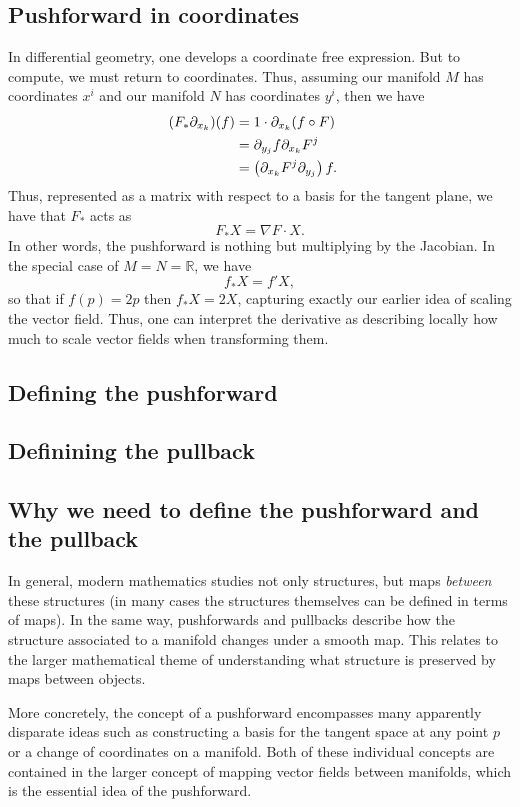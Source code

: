 \documentclass[12pt,letterpaper,boxed]{article}
\newcommand{\R}{{\mathbb{R}}}
\begin{document}
\subsection{Pushforward in coordinates}
In differential geometry, one develops a coordinate free expression. But to compute, we must return to coordinates. Thus, assuming our manifold $M$ has coordinates $x^i$ and our manifold $N$ has coordinates $y^i$, then we have
\[
	\begin{aligned}
		(F_*  \partial_{x_k} )(f) &= 1 \cdot \partial_{x_k} (f \circ F) \cr
		  	       		  &= \partial_{y_j} f \partial_{x_k} F^j \cr
					  &= \left( \partial_{x_k} F^j \partial_{y_j} \right) f.
	\end{aligned}
\]
Thus, represented as a matrix with respect to a basis for the tangent plane, we have that $F_*$ acts as
\[
	F_* X = \nabla F \cdot X.
\]
In other words, the pushforward is nothing but multiplying by the Jacobian. In the special case of $M = N = \R$, we have
\[
	f_* X = f' X,
\]
so that if $f(p) = 2p$ then $f_* X = 2 X$, capturing exactly our earlier idea of scaling the vector field. Thus, one can interpret the derivative as describing locally how much to scale vector fields when transforming them.
\subsection{Defining the pushforward}

\subsection{Definining the pullback}

\subsection{Why we need to define the pushforward and the pullback}
In general, modern mathematics studies not only structures, but maps \textit{between} these structures (in many cases the structures themselves can be defined in terms of maps). In the same way, pushforwards and pullbacks describe how the structure associated to a manifold changes under a smooth map. This relates to the larger mathematical theme of understanding what structure is preserved by maps between objects.

More concretely, the concept of a pushforward encompasses many apparently disparate ideas such as constructing a basis for the tangent space at any point $p$ or a change of coordinates on a manifold. Both of these individual concepts are contained in the larger concept of mapping vector fields between manifolds, which is the essential idea of the pushforward.
\end{document}
